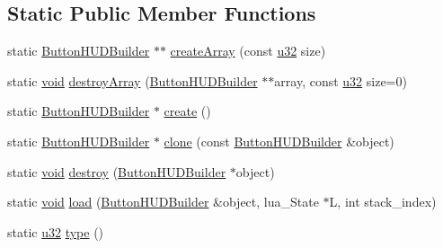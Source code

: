 \subsection*{Static Public Member Functions}
\begin{DoxyCompactItemize}
\item 
static \mbox{\hyperlink{classnjli_1_1_button_h_u_d_builder}{Button\+H\+U\+D\+Builder}} $\ast$$\ast$ \mbox{\hyperlink{classnjli_1_1_button_h_u_d_builder_a885b3db72e0db164d1a1748f18fa15df}{create\+Array}} (const \mbox{\hyperlink{_util_8h_a10e94b422ef0c20dcdec20d31a1f5049}{u32}} size)
\item 
static \mbox{\hyperlink{_thread_8h_af1e856da2e658414cb2456cb6f7ebc66}{void}} \mbox{\hyperlink{classnjli_1_1_button_h_u_d_builder_aa092409e53e74ef1854920bedc7d74fe}{destroy\+Array}} (\mbox{\hyperlink{classnjli_1_1_button_h_u_d_builder}{Button\+H\+U\+D\+Builder}} $\ast$$\ast$array, const \mbox{\hyperlink{_util_8h_a10e94b422ef0c20dcdec20d31a1f5049}{u32}} size=0)
\item 
static \mbox{\hyperlink{classnjli_1_1_button_h_u_d_builder}{Button\+H\+U\+D\+Builder}} $\ast$ \mbox{\hyperlink{classnjli_1_1_button_h_u_d_builder_ab7367f8ad374ecbdda4529d1b1263865}{create}} ()
\item 
static \mbox{\hyperlink{classnjli_1_1_button_h_u_d_builder}{Button\+H\+U\+D\+Builder}} $\ast$ \mbox{\hyperlink{classnjli_1_1_button_h_u_d_builder_a33073ea5b117ad2bcc55176788d5be8d}{clone}} (const \mbox{\hyperlink{classnjli_1_1_button_h_u_d_builder}{Button\+H\+U\+D\+Builder}} \&object)
\item 
static \mbox{\hyperlink{_thread_8h_af1e856da2e658414cb2456cb6f7ebc66}{void}} \mbox{\hyperlink{classnjli_1_1_button_h_u_d_builder_a0559e0c777d3cae524083ec7bc90d197}{destroy}} (\mbox{\hyperlink{classnjli_1_1_button_h_u_d_builder}{Button\+H\+U\+D\+Builder}} $\ast$object)
\item 
static \mbox{\hyperlink{_thread_8h_af1e856da2e658414cb2456cb6f7ebc66}{void}} \mbox{\hyperlink{classnjli_1_1_button_h_u_d_builder_a7805e83ddb3f3bb0718129496e83fda2}{load}} (\mbox{\hyperlink{classnjli_1_1_button_h_u_d_builder}{Button\+H\+U\+D\+Builder}} \&object, lua\+\_\+\+State $\ast$L, int stack\+\_\+index)
\item 
static \mbox{\hyperlink{_util_8h_a10e94b422ef0c20dcdec20d31a1f5049}{u32}} \mbox{\hyperlink{classnjli_1_1_button_h_u_d_builder_a1bbf41b90965dffb1ef55aa7772f5489}{type}} ()
\end{DoxyCompactItemize}

